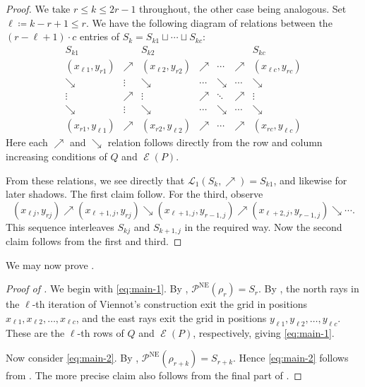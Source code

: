 \documentclass{amsart}
\theoremstyle{definition}
\DeclareMathOperator{\NE}{NE}
\DeclareMathOperator{\evacuation}{\mathcal{E}}
\begin{document}
\begin{proof}
    We take $r \leq k \leq 2r-1$ throughout, the other case being analogous. Set $\ell \coloneq k-r+1 \leq r$. We have the following diagram of relations between the $(r-\ell+1) \cdot c$ entries of $S_k = S_{k1} \sqcup \cdots \sqcup S_{kc}$:
    \[
    \begin{array}{ccccccc}
        S_{k1}
          &
          &
          S_{k2}
          &
          &
          &
          & S_{kc} \\
        \hline
        (x_{\ell1},y_{r1})
          & \nearrow
          & (x_{\ell2},y_{r2})
          & \nearrow
          & \cdots
          & \nearrow
          & (x_{\ell c},y_{rc}) \\
        \searrow
          & \vdots
          & \searrow
          & \cdots
          & \searrow
          & \cdots
          & \searrow \\
        \vdots
          & \nearrow
          & \vdots
          & \nearrow
          & \ddots
          & \nearrow
          & \vdots\\
        \searrow
          & \vdots
          & \searrow
          & \cdots
          & \searrow
          & \cdots
          & \searrow \\
        (x_{r1},y_{\ell 1})
          & \nearrow
          & (x_{r2},y_{\ell 2})
          & \nearrow
          & \cdots
          & \nearrow
          & (x_{rc},y_{\ell c})
    \end{array}
    \]
    Here each $\nearrow$ and $\searrow$ relation follows directly from the row and column increasing conditions of $Q$ and $\evacuation(P)$.

    From these relations, we see directly that $\mathcal{L}_1(S_k, \nearrow) = S_{k1}$, and likewise for later shadows. The first claim follow. For the third, observe
      \[ (x_{\ell j}, y_{r j})
         \nearrow (x_{\ell+1,j}, y_{rj})
         \searrow (x_{\ell+1,j}, y_{r-1,j})
         \nearrow (x_{\ell+2,j}, y_{r-1,j})
         \searrow \cdots. \]
    This sequence interleaves $S_{kj}$ and $S_{k+1,j}$ in the required way. Now the second claim follows from the first and third.
\end{proof}

We may now prove .

\begin{proof}[Proof of ]
    We begin with \eqref{eq:main-1}. By , $\mathcal{P}^{\NE}(\rho_r) = S_r$. By , the north rays in the $\ell$-th iteration of Viennot's construction exit the grid in positions $x_{\ell 1}, x_{\ell 2}, \ldots, x_{\ell c}$, and the east rays exit the grid in positions $y_{\ell 1}, y_{\ell 2}, \ldots, y_{\ell c}$. These are the $\ell$-th rows of $Q$ and $\evacuation(P)$, respectively, giving \eqref{eq:main-1}.

    Now consider \eqref{eq:main-2}. By , $\mathcal{P}^{\NE}(\rho_{r+k}) = S_{r+k}$. Hence \eqref{eq:main-2} follows from . The more precise claim also follows from the final part of .
\end{proof}



\end{document}
